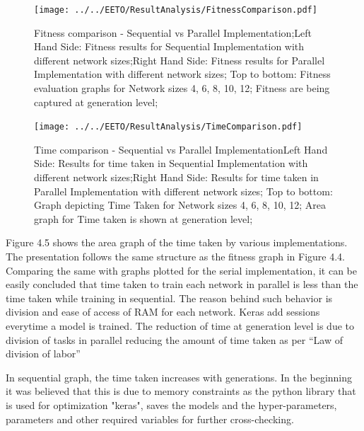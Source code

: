 \begin{figure}
	\texttt{[image: ../../EETO/ResultAnalysis/FitnessComparison.pdf]}
	\caption{Fitness comparison - Sequential vs Parallel Implementation;\newline Left Hand Side: Fitness results for Sequential Implementation with different network sizes;\newline Right Hand Side: Fitness results for Parallel Implementation with different network sizes;
	\newline Top to bottom: Fitness evaluation graphs for Network sizes 4, 6, 8, 10, 12;
	\newline Fitness are being captured at generation level;}
\end{figure}

\begin{figure}
	\texttt{[image: ../../EETO/ResultAnalysis/TimeComparison.pdf]}
	\caption{Time comparison - Sequential vs Parallel Implementation\newline Left Hand Side: Results for time taken in Sequential Implementation with different network sizes;\newline Right Hand Side: Results for time taken in Parallel Implementation with different network sizes;
	\newline Top to bottom: Graph depicting Time Taken for Network sizes 4, 6, 8, 10, 12;
	\newline Area graph for Time taken is shown at generation level;}
\end{figure}


Figure 4.5 shows the area graph of the time taken by various implementations. The presentation follows the same structure as the fitness graph in Figure 4.4.
Comparing the same with graphs plotted for the serial implementation, it can be easily concluded that
time taken to train each network in parallel is less than the time taken
while training in sequential. The reason behind such behavior is
division and ease of access of RAM for each network. Keras add sessions everytime a model is trained.
The reduction of time at generation level is due to division of tasks in parallel reducing the amount of time taken as per ``Law of division of labor''


In sequential graph, the time taken increases with generations.
In the beginning it was believed that this is due to memory constraints as the python library that is used for optimization "keras", saves the models and the hyper-parameters, parameters and other required variables for further cross-checking.


